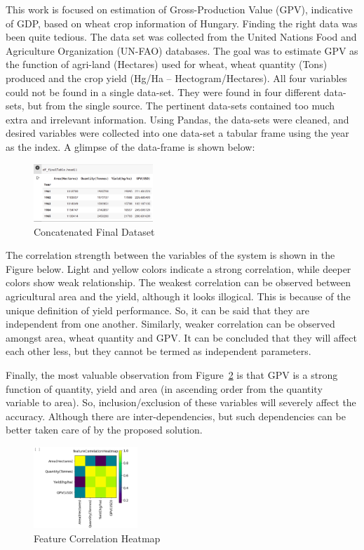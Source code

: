 This work is focused on estimation of Gross-Production Value (GPV), indicative of GDP, based on wheat crop information of Hungary. Finding the right data was been quite tedious. The data set was collected  from the United Nations Food and Agriculture Organization (UN-FAO) databases. The goal was to estimate GPV as the function of agri-land (Hectares) used for wheat, wheat quantity (Tons) produced and the crop yield (Hg/Ha – Hectogram/Hectares). All four variables could not be found in a single data-set. They were found in four different data-sets, but from the single source. The pertinent data-sets contained too much extra and irrelevant information. Using Pandas, the data-sets were cleaned, and desired variables were collected into one data-set a tabular frame using the year as the index. A glimpse of the data-frame is shown below:

\begin{figure}[h!]
	\centering
	\includegraphics[width=0.4\textwidth,height=\textheight,keepaspectratio]{fig/finaltable.png}
	\caption{Concatenated Final Dataset}
	\label{fig:CFD}
\end{figure}


The correlation strength between the variables of the system is shown in the Figure below. Light and yellow colors indicate a strong correlation, while deeper colors show weak relationship. The weakest correlation can be observed between agricultural area and the yield, although it looks illogical. This is because of the unique definition of yield performance. So, it can be said that they are independent from one another. Similarly, weaker correlation can be observed amongst area, wheat quantity and GPV. It can be concluded that they will affect each other less, but they cannot be termed as independent parameters.  

Finally, the most valuable observation from Figure~\ref{fig:Corr} is that GPV is a strong function of quantity, yield and area (in ascending order from the quantity variable to area). So, inclusion/exclusion of these variables will severely affect the accuracy. Although there are inter-dependencies, but such dependencies can be better taken care of by the proposed solution.


\begin{figure}[h!]
	\centering
	\includegraphics[width=0.35\textwidth]{fig/correlation.png}
	\caption{Feature Correlation Heatmap}
	\label{fig:Corr}
\end{figure}


